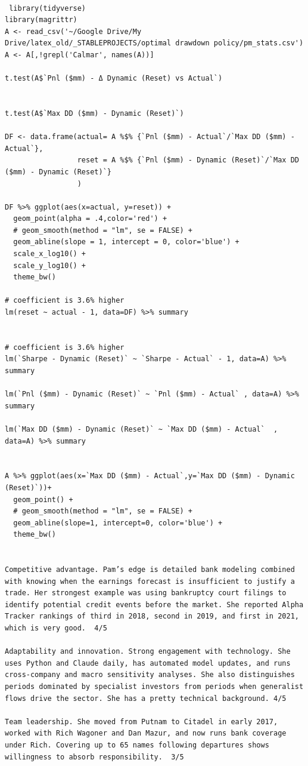 \documentclass[11pt]{gappyarticle}
\begin{document}
\begin{verbatim}
	
 library(tidyverse)
library(magrittr)
A <- read_csv('~/Google Drive/My Drive/latex_old/_STABLEPROJECTS/optimal drawdown policy/pm_stats.csv')
A <- A[,!grepl('Calmar', names(A))]

t.test(A$`Pnl ($mm) - Δ Dynamic (Reset) vs Actual`)


t.test(A$`Max DD ($mm) - Dynamic (Reset)`)

DF <- data.frame(actual= A %$% {`Pnl ($mm) - Actual`/`Max DD ($mm) - Actual`},
                 reset = A %$% {`Pnl ($mm) - Dynamic (Reset)`/`Max DD ($mm) - Dynamic (Reset)`} 
                 )

DF %>% ggplot(aes(x=actual, y=reset)) +
  geom_point(alpha = .4,color='red') + 
  # geom_smooth(method = "lm", se = FALSE) +
  geom_abline(slope = 1, intercept = 0, color='blue') +
  scale_x_log10() +
  scale_y_log10() +
  theme_bw()

# coefficient is 3.6% higher
lm(reset ~ actual - 1, data=DF) %>% summary


# coefficient is 3.6% higher
lm(`Sharpe - Dynamic (Reset)` ~ `Sharpe - Actual` - 1, data=A) %>% summary

lm(`Pnl ($mm) - Dynamic (Reset)` ~ `Pnl ($mm) - Actual` , data=A) %>% summary

lm(`Max DD ($mm) - Dynamic (Reset)` ~ `Max DD ($mm) - Actual`  , data=A) %>% summary


A %>% ggplot(aes(x=`Max DD ($mm) - Actual`,y=`Max DD ($mm) - Dynamic (Reset)`))+
  geom_point() + 
  # geom_smooth(method = "lm", se = FALSE) +
  geom_abline(slope=1, intercept=0, color='blue') +
  theme_bw()
  
   
Competitive advantage. Pam’s edge is detailed bank modeling combined with knowing when the earnings forecast is insufficient to justify a trade. Her strongest example was using bankruptcy court filings to identify potential credit events before the market. She reported Alpha Tracker rankings of third in 2018, second in 2019, and first in 2021, which is very good.  4/5

Adaptability and innovation. Strong engagement with technology. She uses Python and Claude daily, has automated model updates, and runs cross-company and macro sensitivity analyses. She also distinguishes periods dominated by specialist investors from periods when generalist flows drive the sector. She has a pretty technical background. 4/5

Team leadership. She moved from Putnam to Citadel in early 2017, worked with Rich Wagoner and Dan Mazur, and now runs bank coverage under Rich. Covering up to 65 names following departures shows willingness to absorb responsibility.  3/5


\end{verbatim}
\end{document}
